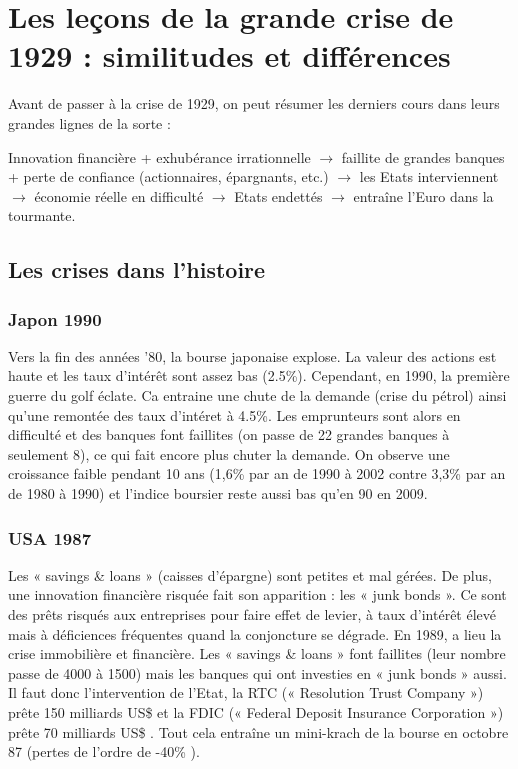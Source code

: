 
\chapter{Les leçons de la grande crise de 1929 :
similitudes et différences}

Avant de passer à la crise de 1929, on peut résumer les derniers cours dans leurs grandes lignes de la sorte : 

\begin{center}
Innovation financière + exhubérance irrationnelle $\rightarrow$ faillite de grandes banques + perte de confiance (actionnaires, épargnants, etc.) $\rightarrow$ les Etats interviennent $\rightarrow$ économie réelle en difficulté $\rightarrow$ Etats endettés $\rightarrow$ entraîne l'Euro dans la tourmante.
\end{center} 

\section{Les crises dans l'histoire}
\subsection{Japon 1990}
Vers la fin des années '80, la bourse japonaise explose. La valeur des actions est haute et les taux d'intérêt sont assez bas (2.5\%). Cependant, en 1990, la première guerre du golf éclate. Ca entraine une chute de la demande (crise du pétrol) ainsi qu'une remontée des taux d'intéret à 4.5\%. Les emprunteurs sont alors en difficulté et des banques font faillites (on passe de 22 grandes banques à seulement 8), ce qui fait encore plus chuter la demande. On observe une croissance faible pendant 10 ans (1,6\% par an de 1990 à 2002 contre 3,3\% par an de 1980 à 1990) et l'indice boursier reste aussi bas qu'en 90 en 2009.

\subsection{USA 1987}
Les « savings \& loans » (caisses d’épargne) sont petites et mal gérées. De plus, une innovation financière risquée fait son apparition : les « junk bonds ». Ce sont des prêts risqués aux entreprises pour faire effet de levier, à taux d'intérêt élevé mais à déficiences fréquentes quand la conjoncture se dégrade. En 1989, a lieu la crise immobilière et financière. Les « savings \& loans » font faillites (leur nombre passe de 4000 à 1500) mais les banques qui ont investies en « junk bonds » aussi. Il faut donc l'intervention de l’Etat, la RTC (« Resolution Trust Company ») prête 150 milliards US\$ et la FDIC (« Federal Deposit Insurance Corporation ») prête 70 milliards US\$ . Tout cela entraîne un mini-krach de la bourse en octobre 87 (pertes de l'ordre de -40\% ).

